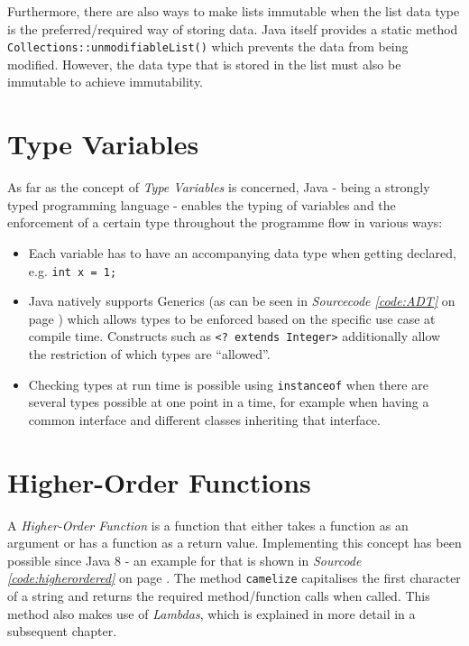 \documentclass[a4paper,12pt,twoside]{scrreprt}
\begin{document}
\medskip

Furthermore, there are also ways to make lists immutable when the list data type is the preferred/required way of storing data. Java itself provides a static method \texttt{Collections::unmodifiableList()} which prevents the data from being modified. However, the data type that is stored in the list must also be immutable to achieve immutability.

\section{Type Variables}
As far as the concept of \textit{Type Variables} is concerned, Java - being a strongly typed programming language - enables the typing of variables and the enforcement of a certain type throughout the programme flow in various ways:

\begin{itemize}
    \item Each variable has to have an accompanying data type when getting declared, e.g. \texttt{int x = 1;}
    \item Java natively supports Generics (as can be seen in \textit{Sourcecode \ref{code:ADT}} on page \pageref{code:ADT}) which allows types to be enforced based on the specific use case at compile time. Constructs such as \texttt{<? extends Integer>} additionally allow the restriction of which types are \enquote{allowed}.
    \item Checking types at run time is possible using \texttt{instanceof} when there are several types possible at one point in a time, for example when having a common interface and different classes inheriting that interface.
\end{itemize}

\section{Higher-Order Functions}
A \textit{Higher-Order Function} is a function that either takes a function as an argument or has a function as a return value. Implementing this concept has been possible since Java 8 - an example for that is shown in \textit{Sourcode \ref{code:higherordered}} on page \pageref{code:higherordered}. The method \texttt{camelize} capitalises the first character of a string and returns the required method/function calls when called. This method also makes use of \textit{Lambdas}, which is explained in more detail in a subsequent chapter.
\end{document}
